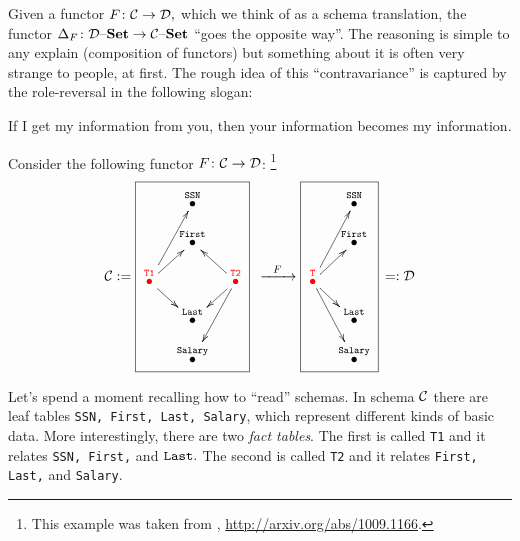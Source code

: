 \documentclass[CT4S-EN-RU]{subfiles}
\begin{document}
\begin{blockRUS}
\end{blockRUS}

\begin{remarkENG}
Given a functor $F\colon\mathcal{C}\rightarrow\mathcal{D},$ which we think of as a schema translation, the functor $\Delta_F\colon\mathcal{D}{\text \textendash}{\mathbf{Set}}\rightarrow\mathcal{C}{\text \textendash}{\mathbf{Set}}$ “goes the opposite way”. The reasoning is simple to any explain (composition of functors) but something about it is often very strange to people, at first. The rough idea of this “contravariance” is captured by the role-reversal in the following slogan:
\end{remarkENG}

\begin{remarkRUS}
\end{remarkRUS}

\begin{sloganENG} 
If I get my information from you, then your information becomes my information. 
\end{sloganENG}

\begin{sloganRUS} 
\end{sloganRUS}

\begin{blockENG}
Consider the following functor $F\colon\mathcal{C}\rightarrow\mathcal{D}$: 
\footnote{This example was taken from \cite{Sp1}, \url{http://arxiv.org/abs/1009.1166}.}
\begin{align}\label{dia:translation}
\mcC:=\parbox{1.2in}{\fbox{\xymatrix@=10pt{&\LTO{SSN}\\&\LTO{First}\\\color{red}{\LTO{T1}}\ar[uur]\ar[ur]\ar[dr]&&\color{red}{\LTO{T2}}\ar[ul]\ar[dl]\ar[ddl]\\&\LTO{Last}\\&\LTO{Salary}}}}\Too{F}\parbox{.8in}{\fbox{\xymatrix@=10pt{&\LTO{SSN}\\&\LTO{First}\\\color{red}{\LTO{T}}\ar[uur]\ar[ur]\ar[dr]\ar[ddr]\\&\LTO{Last}\\&\LTO{Salary}}}}=:\mcD
\end{align}
\end{blockENG}

\begin{blockRUS}
\end{blockRUS}

\begin{blockENG}
Let's spend a moment recalling how to “read” schemas. In schema $\mathcal{C}$ there are leaf tables {\tt SSN, First, Last, Salary}, which represent different kinds of basic data. More interestingly, there are two {\em fact tables}. The first is called {\tt T1} and it relates {\tt SSN, First,} and ${\tt Last}.$ The second is called {\tt T2} and it relates {\tt First, Last,} and {\tt Salary}.
\end{blockENG}
\end{document}
